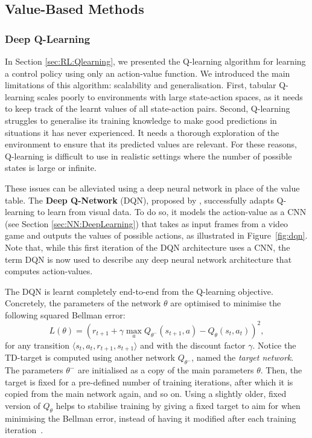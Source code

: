 \subsection{Value-Based Methods}

\subsubsection{Deep Q-Learning}\label{sec:DRL:DQN}

In Section \ref{sec:RL:Qlearning}, we presented the Q-learning algorithm for learning a control policy using only an action-value function. We introduced the main limitations of this algorithm: scalability and generalisation. First, tabular Q-learning scales poorly to environments with large state-action spaces, as it needs to keep track of the learnt values of all state-action pairs. Second, Q-learning struggles to generalise its training knowledge to make good predictions in situations it has never experienced. It needs a thorough exploration of the environment to ensure that its predicted values are relevant. For these reasons, Q-learning is difficult to use in realistic settings where the number of possible states is large or infinite. 

These issues can be alleviated using a deep neural network in place of the value table. The \textbf{Deep Q-Network} (DQN), proposed by \cite{Mnih2013_DQN}, successfully adapts Q-learning to learn from visual data. To do so, it models the action-value as a CNN (see Section \ref{sec:NN:DeepLearning}) that takes as input frames from a video game and outputs the values of possible actions, as illustrated in Figure~\ref{fig:dqn}. Note that, while this first iteration of the DQN architecture uses a CNN, the term DQN is now used to describe any deep neural network architecture that computes action-values. 

The DQN is learnt completely end-to-end from the Q-learning objective. Concretely, the parameters of the network $\theta$ are optimised to minimise the following squared Bellman error:
\begin{equation}
    L(\theta)=\left(r_{t+1}+\gamma\max_{a}Q_{{\theta^-}}(s_{t+1},a)-Q_\theta(s_t,a_t)\right)^2,
\end{equation}
for any transition $\langle s_t,a_t,r_{t+1},s_{t+1}\rangle$ and with the discount factor $\gamma$. Notice the TD-target is computed using another network $Q_{\theta^-}$, named the \textit{target network}. The parameters $\theta^-$ are initialised as a copy of the main parameters $\theta$. Then, the target is fixed for a pre-defined number of training iterations, after which it is copied from the main network again, and so on. Using a slightly older, fixed version of $Q_\theta$ helps to stabilise training by giving a fixed target to aim for when minimising the Bellman error, instead of having it modified after each training iteration~\citep{Mnih2015_DQN}. 

